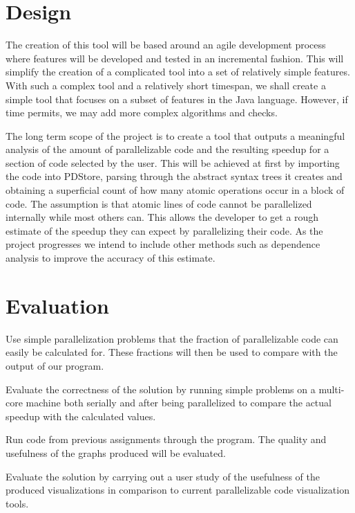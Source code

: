 \documentclass[a4paper]{article}
\begin{document}
\section{Design}
The creation of this tool will be based around an agile development process
where features will be developed and tested in an incremental fashion. This
will simplify the creation of a complicated tool into a set of relatively simple
features. With such a complex tool and a relatively short timespan, we shall create a simple tool that focuses on a subset of features in the Java language. However, if time permits, we may add more complex algorithms and checks.

The long term scope of the project is to create a tool that outputs a meaningful analysis of the amount of parallelizable code and the resulting speedup for a section of code selected by the user. This will be achieved at first by importing the code into PDStore, parsing through the abstract syntax trees it creates and obtaining a
superficial count of how many atomic operations occur in a block of code. The
assumption is that atomic lines of code cannot be parallelized internally while
most others can. This allows the developer to get a rough estimate of the speedup
they can expect by parallelizing their code. As the project progresses we intend
to include other methods such as dependence analysis to improve the accuracy of
this estimate.

\section{Evaluation}
\begin{description}
\item Use simple parallelization problems that the fraction of parallelizable
code can easily be calculated for. These fractions will then be used to compare
with the output of our program.
\item Evaluate the correctness of the solution by running simple problems on a
multi-core machine both serially and after being parallelized to compare the
actual speedup with the calculated values.
\item Run code from previous assignments through the program. The quality and usefulness of the graphs produced
will be evaluated.
\item Evaluate the solution by carrying out a user study of the usefulness of
the produced visualizations in comparison to current parallelizable code
visualization tools.
\end{description}
 
\end{document}

